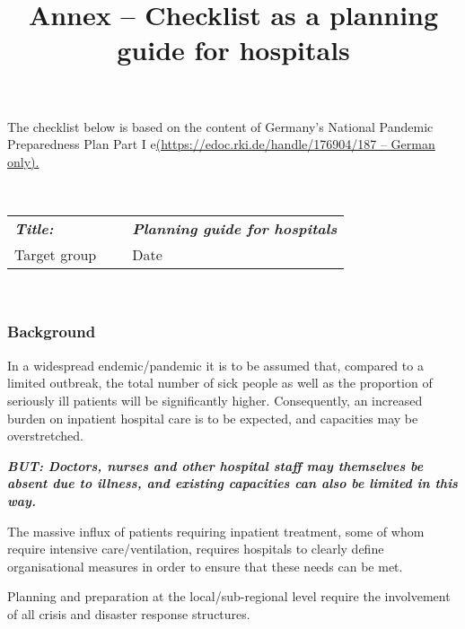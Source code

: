 \documentclass{article}
\begin{document}
\title{Annex – Checklist as a planning guide for hospitals}

\maketitle





The checklist below is based on the content of Germany's National Pandemic Preparedness Plan Part I e\href{file:///C:\Users\boesl_reg\AppData\Local\Microsoft\Windows\INetCache\Content.Outlook\SFW45WES\(https:\edoc.rki.de\handle\176904\187%20–%20German%20only)}{(https://edoc.rki.de/handle/176904/187 – German only).}





 


\begin{tabu} to \textwidth { |X|X|X| }
\hline



\emph{\textbf{Title:}} &  & \emph{\textbf{Planning guide for hospitals}}
 \\


Target group &   & Date
 \\
\hline

\end{tabu}

 


\subsubsection{Background}\label{H7945097}



In a widespread endemic/pandemic it is to be assumed that, compared to a limited outbreak, the total number of sick people as well as the proportion of seriously ill patients will be significantly higher. Consequently, an increased burden on inpatient hospital care is to be expected, and capacities may be overstretched.


\emph{\textbf{BUT: Doctors, nurses and other hospital staff may themselves be absent due to illness, and existing capacities can also be limited in this way.}}


The massive influx of patients requiring inpatient treatment, some of whom require intensive care/ventilation, requires hospitals to clearly define organisational measures in order to ensure that these needs can be met.


Planning and preparation at the local/sub-regional level require the involvement of all crisis and disaster response structures. 
\end{document}
